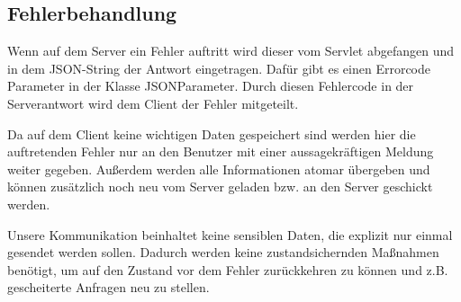 \begin {center}
\end {center}

	\subsection{Fehlerbehandlung}
Wenn auf dem Server ein Fehler auftritt wird dieser vom Servlet abgefangen und in dem JSON-String der Antwort eingetragen. Dafür gibt es einen Errorcode Parameter in der Klasse JSONParameter. Durch diesen Fehlercode in der Serverantwort wird dem Client der Fehler mitgeteilt.\par

Da auf dem Client keine wichtigen Daten gespeichert sind werden hier die auftretenden Fehler nur an den Benutzer mit einer aussagekräftigen Meldung weiter gegeben. Außerdem werden alle Informationen atomar übergeben und können zusätzlich noch neu vom Server geladen bzw. an den Server geschickt werden. \par

Unsere Kommunikation beinhaltet keine sensiblen Daten, die explizit nur einmal gesendet werden sollen. Dadurch werden keine zustandsichernden Maßnahmen benötigt, um auf den Zustand vor dem Fehler zurückkehren zu können und z.B. gescheiterte Anfragen neu zu stellen.

	\newpage
